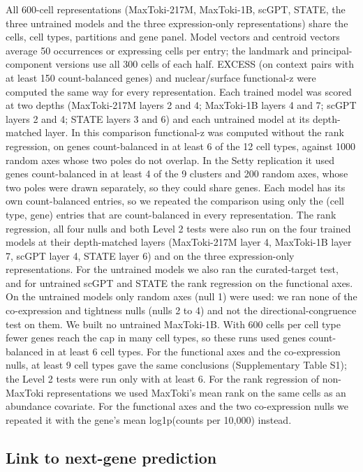 \documentclass[
  11pt,
]{article}
\newcounter{none} %
\begin{document}
All 600-cell representations (MaxToki-217M, MaxToki-1B, scGPT, STATE,
the three untrained models and the three expression-only
representations) share the cells, cell types, partitions and gene panel.
Model vectors and centroid vectors average 50 occurrences or expressing
cells per entry; the landmark and principal-component versions use all
300 cells of each half. EXCESS (on context pairs with at least 150
count-balanced genes) and nuclear/surface functional-z were computed the
same way for every representation. Each trained model was scored at two
depths (MaxToki-217M layers 2 and 4; MaxToki-1B layers 4 and 7; scGPT
layers 2 and 4; STATE layers 3 and 6) and each untrained model at its
depth-matched layer. In this comparison functional-z was computed
without the rank regression, on genes count-balanced in at least 6 of
the 12 cell types, against 1000 random axes whose two poles do not
overlap. In the Setty replication it used genes count-balanced in at
least 4 of the 9 clusters and 200 random axes, whose two poles were
drawn separately, so they could share genes. Each model has its own
count-balanced entries, so we repeated the comparison using only the
(cell type, gene) entries that are count-balanced in every
representation. The rank regression, all four nulls and both Level 2
tests were also run on the four trained models at their depth-matched
layers (MaxToki-217M layer 4, MaxToki-1B layer 7, scGPT layer 4, STATE
layer 6) and on the three expression-only representations. For the
untrained models we also ran the curated-target test, and for untrained
scGPT and STATE the rank regression on the functional axes. On the
untrained models only random axes (null 1) were used: we ran none of the
co-expression and tightness nulls (nulls 2 to 4) and not the
directional-congruence test on them. We built no untrained MaxToki-1B.
With 600 cells per cell type fewer genes reach the cap in many cell
types, so these runs used genes count-balanced in at least 6 cell types.
For the functional axes and the co-expression nulls, at least 9 cell
types gave the same conclusions (Supplementary Table S1); the Level 2
tests were run only with at least 6. For the rank regression of
non-MaxToki representations we used MaxToki's mean rank on the same
cells as an abundance covariate. For the functional axes and the two
co-expression nulls we repeated it with the gene's mean log1p(counts per
10,000) instead.

\subsection{Link to next-gene
prediction}\label{link-to-next-gene-prediction}
\end{document}
